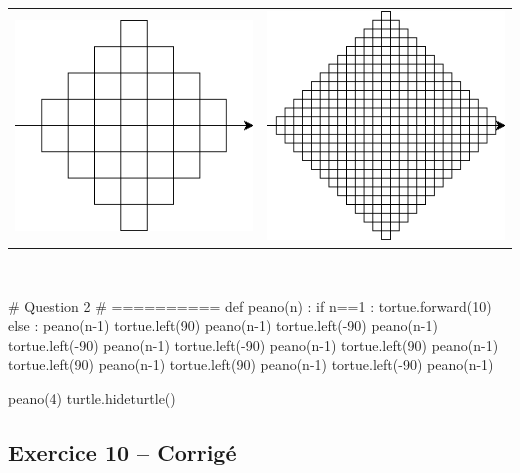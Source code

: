 \documentclass[10pt,fleqn]{article} %
\begin{document}
\begin{center}
\begin{tabular}{cc}
\includegraphics[width=.3\linewidth]{images/exo_FB_09_01}&
\includegraphics[width=.3\linewidth]{images/exo_FB_09_02}
\end{tabular}
\end{center}



\begin{corrige}
$\quad$
\begin{python}
# Question 2 
# ==========
def peano(n) : 
    if n==1 :
        tortue.forward(10)
    else : 
        peano(n-1)
        tortue.left(90)
        peano(n-1)
        tortue.left(-90)
        peano(n-1)
        tortue.left(-90)
        peano(n-1)
        tortue.left(-90)
        peano(n-1)
        tortue.left(90)
        peano(n-1)
        tortue.left(90)
        peano(n-1)
        tortue.left(90)
        peano(n-1)
        tortue.left(-90)
        peano(n-1)
        
peano(4)
turtle.hideturtle()
\end{python}
\end{corrige}



\subsection*{Exercice 10 -- Corrigé}
\end{document}
